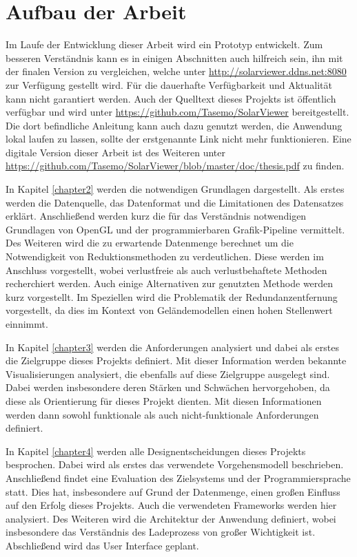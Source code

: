 \section{Aufbau der Arbeit}
Im Laufe der Entwicklung dieser Arbeit wird ein Prototyp entwickelt. Zum besseren Verständnis kann es in einigen Abschnitten auch hilfreich sein, ihn mit der finalen Version zu vergleichen, welche unter \url{http://solarviewer.ddns.net:8080} zur Verfügung gestellt wird. Für die dauerhafte Verfügbarkeit und Aktualität kann nicht garantiert werden. Auch der Quelltext dieses Projekts ist öffentlich verfügbar und wird unter \url{https://github.com/Tasemo/SolarViewer} bereitgestellt. Die dort befindliche Anleitung kann auch dazu genutzt werden, die Anwendung lokal laufen zu lassen, sollte der erstgenannte Link nicht mehr funktionieren. Eine digitale Version dieser Arbeit ist des Weiteren unter \url{https://github.com/Tasemo/SolarViewer/blob/master/doc/thesis.pdf} zu finden.

In Kapitel \ref{chapter2} werden die notwendigen Grundlagen dargestellt. Als erstes werden die Datenquelle, das Datenformat und die Limitationen des Datensatzes erklärt. Anschließend werden kurz die für das Verständnis notwendigen Grundlagen von OpenGL und der programmierbaren Grafik-Pipeline vermittelt. Des Weiteren wird die zu erwartende Datenmenge berechnet um die Notwendigkeit von Reduktionsmethoden zu verdeutlichen. Diese werden im Anschluss vorgestellt, wobei verlustfreie als auch verlustbehaftete Methoden recherchiert werden. Auch einige Alternativen zur genutzten Methode werden kurz vorgestellt. Im Speziellen wird die Problematik der Redundanzentfernung vorgestellt, da dies im Kontext von Geländemodellen einen hohen Stellenwert einnimmt.

In Kapitel \ref{chapter3} werden die Anforderungen analysiert und dabei als erstes die Zielgruppe dieses Projekts definiert. Mit dieser Information werden bekannte Visualisierungen analysiert, die ebenfalls auf diese Zielgruppe ausgelegt sind. Dabei werden insbesondere deren Stärken und Schwächen hervorgehoben, da diese als Orientierung für dieses Projekt dienten. Mit diesen Informationen werden dann sowohl funktionale als auch nicht-funktionale Anforderungen definiert.

In Kapitel \ref{chapter4} werden alle Designentscheidungen dieses Projekts besprochen. Dabei wird als erstes das verwendete Vorgehensmodell beschrieben. Anschließend findet eine Evaluation des Zielsystems und der Programmiersprache statt. Dies hat, insbesondere auf Grund der Datenmenge, einen großen Einfluss auf den Erfolg dieses Projekts. Auch die verwendeten Frameworks werden hier analysiert. Des Weiteren wird die Architektur der Anwendung definiert, wobei insbesondere das Verständnis des Ladeprozess von großer Wichtigkeit ist. Abschließend wird das User Interface geplant.

